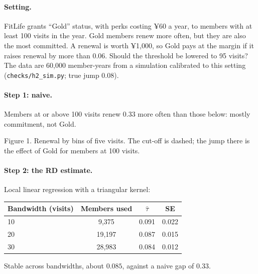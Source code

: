 \documentclass[11pt]{article}
\begin{document}

\sectiontwo

\paragraph{Setting.} FitLife grants ``Gold'' status, with perks costing ¥60 a year, to members with at least 100 visits in the year. Gold members renew
more often, but they are also the most committed. A renewal is worth ¥1{,}000, so Gold pays at the margin if it raises renewal by more than $0.06$.
Should the threshold be lowered to 95 visits? The data are 60{,}000 member-years from a simulation calibrated to this setting
(\texttt{checks/h2\_sim.py}; true jump $0.08$).

\paragraph{Step 1: naive.} Members at or above 100 visits renew $0.33$ more often than those below: mostly commitment, not Gold.

\begin{center}

\small Figure 1. Renewal by bins of five visits. The cut-off is dashed; the jump there is the effect of Gold for members at 100 visits.
\end{center}

\paragraph{Step 2: the RD estimate.} Local linear regression with a triangular kernel:
\begin{center}
\begin{tabular}{lccc}
\toprule
Bandwidth (visits) & Members used & $\hat\tau$ & SE \\
\midrule
10 & 9{,}375 & 0.091 & 0.022 \\
20 & 19{,}197 & 0.087 & 0.015 \\
30 & 28{,}983 & 0.084 & 0.012 \\
\bottomrule
\end{tabular}
\end{center}
Stable across bandwidths, about $0.085$, against a naive gap of $0.33$.
\end{document}
